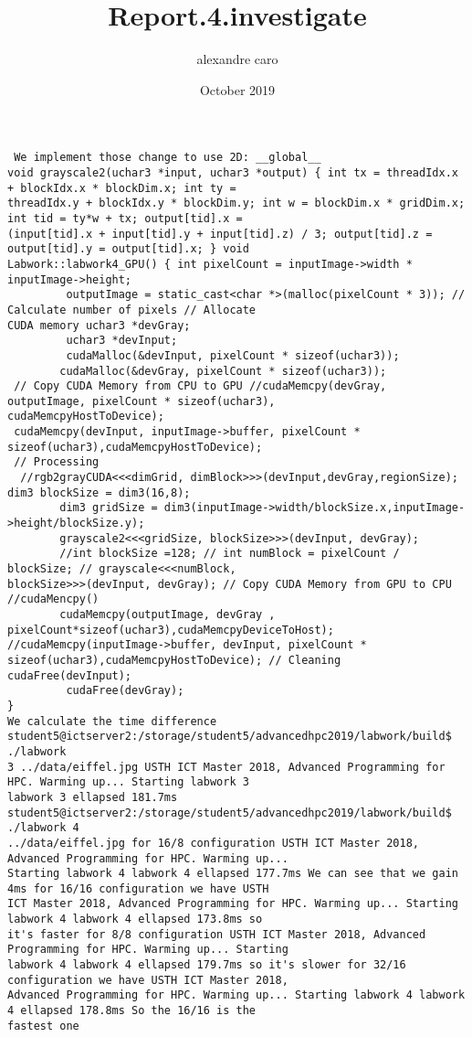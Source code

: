 \documentclass{article} \usepackage[utf8]{inputenc} \title{Report.4.investigate} \author{alexandre caro }
\date{October 2019}
\begin{document}
 \maketitle \begin{verbatim} We implement those change to use 2D: __global__ 
void grayscale2(uchar3 *input, uchar3 *output) { int tx = threadIdx.x + blockIdx.x * blockDim.x; int ty = 
threadIdx.y + blockIdx.y * blockDim.y; int w = blockDim.x * gridDim.x; int tid = ty*w + tx; output[tid].x = 
(input[tid].x + input[tid].y + input[tid].z) / 3; output[tid].z = output[tid].y = output[tid].x; } void 
Labwork::labwork4_GPU() { int pixelCount = inputImage->width * inputImage->height;
         outputImage = static_cast<char *>(malloc(pixelCount * 3)); // Calculate number of pixels // Allocate 
CUDA memory uchar3 *devGray;
         uchar3 *devInput;
         cudaMalloc(&devInput, pixelCount * sizeof(uchar3));
        cudaMalloc(&devGray, pixelCount * sizeof(uchar3));
 // Copy CUDA Memory from CPU to GPU //cudaMemcpy(devGray, outputImage, pixelCount * sizeof(uchar3), 
cudaMemcpyHostToDevice);
 cudaMemcpy(devInput, inputImage->buffer, pixelCount * sizeof(uchar3),cudaMemcpyHostToDevice);
 // Processing
  //rgb2grayCUDA<<<dimGrid, dimBlock>>>(devInput,devGray,regionSize); dim3 blockSize = dim3(16,8);
        dim3 gridSize = dim3(inputImage->width/blockSize.x,inputImage->height/blockSize.y);
        grayscale2<<<gridSize, blockSize>>>(devInput, devGray);
        //int blockSize =128; // int numBlock = pixelCount / blockSize; // grayscale<<<numBlock, 
blockSize>>>(devInput, devGray); // Copy CUDA Memory from GPU to CPU //cudaMencpy()
        cudaMemcpy(outputImage, devGray , pixelCount*sizeof(uchar3),cudaMemcpyDeviceToHost); 
//cudaMemcpy(inputImage->buffer, devInput, pixelCount * sizeof(uchar3),cudaMemcpyHostToDevice); // Cleaning 
cudaFree(devInput);
         cudaFree(devGray);
}             
We calculate the time difference student5@ictserver2:/storage/student5/advancedhpc2019/labwork/build$ ./labwork 
3 ../data/eiffel.jpg USTH ICT Master 2018, Advanced Programming for HPC. Warming up... Starting labwork 3 
labwork 3 ellapsed 181.7ms student5@ictserver2:/storage/student5/advancedhpc2019/labwork/build$ ./labwork 4 
../data/eiffel.jpg for 16/8 configuration USTH ICT Master 2018, Advanced Programming for HPC. Warming up... 
Starting labwork 4 labwork 4 ellapsed 177.7ms We can see that we gain 4ms for 16/16 configuration we have USTH 
ICT Master 2018, Advanced Programming for HPC. Warming up... Starting labwork 4 labwork 4 ellapsed 173.8ms so 
it's faster for 8/8 configuration USTH ICT Master 2018, Advanced Programming for HPC. Warming up... Starting 
labwork 4 labwork 4 ellapsed 179.7ms so it's slower for 32/16 configuration we have USTH ICT Master 2018, 
Advanced Programming for HPC. Warming up... Starting labwork 4 labwork 4 ellapsed 178.8ms So the 16/16 is the 
fastest one \end{verbatim} 
\end{document}
